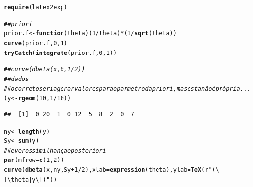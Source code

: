 \documentclass[11pt,a4]{article}\usepackage[]{graphicx}\usepackage[]{xcolor}
\makeatletter
\newcommand{\hlnum}[1]{\textcolor[rgb]{0.686,0.059,0.569}{#1}}%
\newcommand{\hlsng}[1]{\textcolor[rgb]{0.192,0.494,0.8}{#1}}%
\newcommand{\hlcom}[1]{\textcolor[rgb]{0.678,0.584,0.686}{\textit{#1}}}%
\newcommand{\hlopt}[1]{\textcolor[rgb]{0,0,0}{#1}}%
\newcommand{\hldef}[1]{\textcolor[rgb]{0.345,0.345,0.345}{#1}}%
\newcommand{\hlkwa}[1]{\textcolor[rgb]{0.161,0.373,0.58}{\textbf{#1}}}%
\newcommand{\hlkwb}[1]{\textcolor[rgb]{0.69,0.353,0.396}{#1}}%
\newcommand{\hlkwc}[1]{\textcolor[rgb]{0.333,0.667,0.333}{#1}}%
\newcommand{\hlkwd}[1]{\textcolor[rgb]{0.737,0.353,0.396}{\textbf{#1}}}%
\newenvironment{kframe}{%
 \def\at@end@of@kframe{}%
 \ifinner\ifhmode%
  \def\at@end@of@kframe{\end{minipage}}%
  \begin{minipage}{\columnwidth}%
 \fi\fi%
 \def\FrameCommand##1{\hskip\@totalleftmargin \hskip-\fboxsep
 \colorbox{shadecolor}{##1}\hskip-\fboxsep
     \hskip-\linewidth \hskip-\@totalleftmargin \hskip\columnwidth}%
 \MakeFramed {\advance\hsize-\width
   \@totalleftmargin\z@ \linewidth\hsize
   \@setminipage}}%
 {\par\unskip\endMakeFramed%
 \at@end@of@kframe}
\newenvironment{knitrout}{}{} %
\makeatother
\begin{document}
\begin{enumerate}
  
\begin{solucao}
\begin{knitrout}
\color{fgcolor}\begin{kframe}
\begin{alltt}
\hlkwd{require}\hldef{(latex2exp)}
\end{alltt}


{\ttfamily\noindent\itshape\color{messagecolor}{\#\# Carregando pacotes exigidos: latex2exp}}\begin{alltt}
\hlcom{## priori}
\hldef{prior.f} \hlkwb{<-} \hlkwa{function}\hldef{(}\hlkwc{theta}\hldef{) (}\hlnum{1}\hlopt{/}\hldef{theta)}\hlopt{*}\hldef{(}\hlnum{1}\hlopt{/}\hlkwd{sqrt}\hldef{(theta))}
\hlkwd{curve}\hldef{(prior.f,} \hlnum{0}\hldef{,} \hlnum{1}\hldef{)}
\hlkwd{tryCatch}\hldef{(}\hlkwd{integrate}\hldef{(prior.f,} \hlnum{0}\hldef{,} \hlnum{1}\hldef{))}
\end{alltt}


{\ttfamily\noindent\bfseries\color{errorcolor}{\#\# Error in integrate(prior.f, 0, 1): the integral is probably divergent}}\begin{alltt}
\hlcom{##curve(dbeta(x, 0, 1/2))}
\hlcom{## dados}
\hlcom{## o correto seria gerar valores para o parmetro da priori, mas esta não é própria ...}
\hldef{(y} \hlkwb{<-} \hlkwd{rgeom}\hldef{(}\hlnum{10}\hldef{,} \hlnum{1}\hlopt{/}\hlnum{10}\hldef{))}
\end{alltt}
\begin{verbatim}
##  [1]  0 20  1  0 12  5  8  2  0  7
\end{verbatim}
\begin{alltt}
\hldef{ny} \hlkwb{<-} \hlkwd{length}\hldef{(y)}
\hldef{Sy} \hlkwb{<-} \hlkwd{sum}\hldef{(y)}
\hlcom{## e verossimilhança e posteriori}
\hlkwd{par}\hldef{(}\hlkwc{mfrow}\hldef{=}\hlkwd{c}\hldef{(}\hlnum{1}\hldef{,}\hlnum{2}\hldef{))}
\hlkwd{curve}\hldef{(}\hlkwd{dbeta}\hldef{(x, ny, Sy} \hlopt{+} \hlnum{1}\hlopt{/}\hlnum{2}\hldef{),} \hlkwc{xlab} \hldef{=} \hlkwd{expression}\hldef{(theta),} \hlkwc{ylab} \hldef{=} \hlkwd{TeX}\hldef{(}\hlsng{r"(\textbackslash{}[\textbackslash{}theta|y\textbackslash{}])"}\hldef{))}
\end{alltt}


{\ttfamily\noindent{}}


\end{kframe}
\end{knitrout}
\end{solucao}
\end{enumerate}
\end{document}
